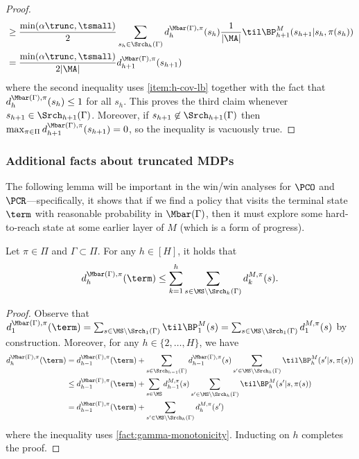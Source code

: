 \begin{proof}
\begin{align*}
&\geq \frac{\min(\alpha\trunc,\tsmall)}{2}\sum_{s_h\in\Srch_h(\Gamma)} d^{\Mbar(\Gamma),\pi}_h(s_h) \frac{1}{|\MA|} \til\BP^M_{h+1}(s_{h+1}|s_h,\pi(s_h)) \\
&= \frac{\min(\alpha\trunc,\tsmall)}{2|\MA|} d^{\Mbar(\Gamma),\pi}_{h+1}(s_{h+1})
\end{align*}
where the second inequality uses \cref{item:h-cov-lb} together with the fact that $d^{\Mbar(\Gamma),\pi}_h(s_h) \leq 1$ for all $s_h$. This proves the third claim whenever $s_{h+1} \in \Srch_{h+1}(\Gamma)$. Moreover, if $s_{h+1} \not \in \Srch_{h+1}(\Gamma)$ then $\max_{\pi\in\Pi} d^{\Mbar(\Gamma),\pi}_{h+1}(s_{h+1}) = 0$, so the inequality is vacuously true.
\end{proof}

\subsubsection{Additional facts about truncated MDPs}

The following lemma will be important in the win/win analyses for $\PCO$ and $\PCR$---specifically, it shows that if we find a policy that visits the terminal state $\term$ with reasonable probability in $\Mbar(\Gamma)$, then it must explore some hard-to-reach state at some earlier layer of $M$ (which is a form of progress).

\begin{lemma}\label{lemma:term-prob}
Let $\pi \in \Pi$ and $\Gamma \subset \Pi$. For any $h \in [H]$, it holds that \[d^{\Mbar(\Gamma),\pi}_h(\term) \leq \sum_{k=1}^h \sum_{s \in \MS\setminus \Srch_k(\Gamma)} d^{M,\pi}_k(s).\]
\end{lemma}

\begin{proof}
Observe that $d^{\Mbar(\Gamma),\pi}_1(\term) = \sum_{s \in \MS\setminus \Srch_1(\Gamma)} \til\BP^M_1(s) = \sum_{s \in \MS\setminus \Srch_1(\Gamma)} d^{M,\pi}_1(s)$ by construction. Moreover, for any $h \in \{2,\dots,H\}$, we have
\begin{align*}
d^{\Mbar(\Gamma),\pi}_h(\term)
&= d^{\Mbar(\Gamma),\pi}_{h-1}(\term) + \sum_{s \in \Srch_{h-1}(\Gamma)} d^{\Mbar(\Gamma),\pi}_{h-1}(s) \sum_{s' \in \MS \setminus \Srch_h(\Gamma)} \til\BP^M_h(s'|s,\pi(s)) \\ 
&\leq d^{\Mbar(\Gamma),\pi}_{h-1}(\term) + \sum_{s \in \MS} d^{M,\pi}_{h-1}(s) \sum_{s' \in \MS \setminus \Srch_h(\Gamma)} \til\BP^M_h(s'|s,\pi(s)) \\ 
&= d^{\Mbar(\Gamma),\pi}_{h-1}(\term) + \sum_{s' \in \MS \setminus \Srch_h(\Gamma)} d^{M,\pi}_h(s')
\end{align*}
where the inequality uses \cref{fact:gamma-monotonicity}. Inducting on $h$ completes the proof.
\end{proof}

